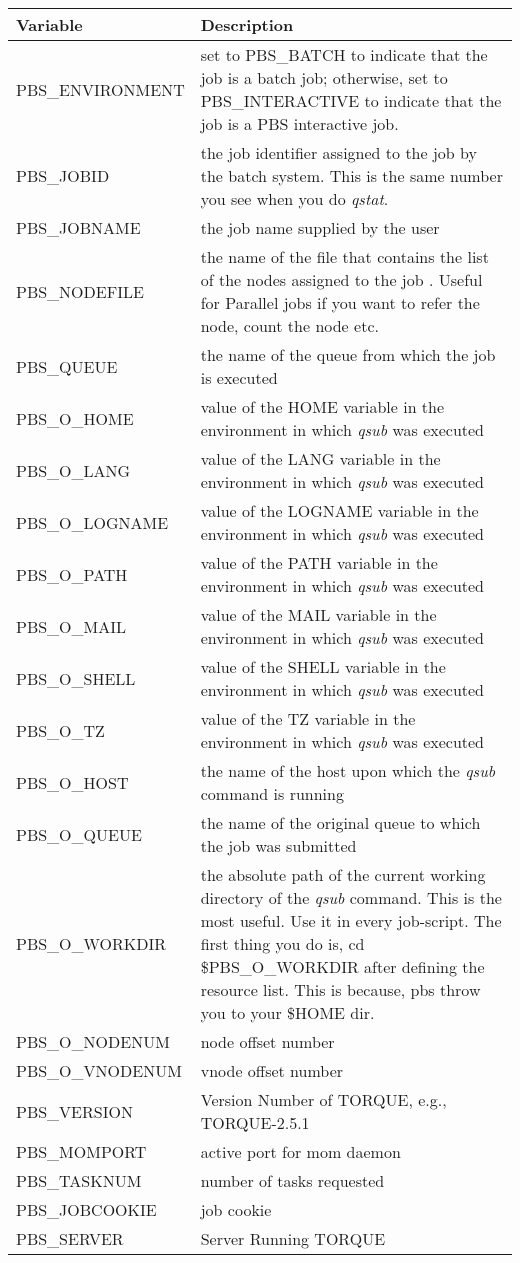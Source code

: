 \begin{tabular}{|p{1.2in}|p{3.0in}|} \hline
\textbf{Variable} & \textbf{Description} \\ \hline
PBS\_ENVIRONMENT & set to PBS\_BATCH to indicate that the job is a batch job; otherwise, set to PBS\_INTERACTIVE to indicate that the job is a PBS interactive job. \\ \hline
PBS\_JOBID & the job identifier assigned to the job by the batch system. This is the same number you see when you do \textit{qstat}. \\ \hline
PBS\_JOBNAME & the job name supplied by the user \\ \hline
PBS\_NODEFILE & the name of the file that contains the list of the nodes assigned to the job . Useful for Parallel jobs if you want to refer the node, count the node etc. \\ \hline
PBS\_QUEUE & the name of the queue from which the job is executed \\ \hline
PBS\_O\_HOME & value of the HOME variable in the environment in which \textit{qsub} was executed \\ \hline
PBS\_O\_LANG & value of the LANG variable in the environment in which \textit{qsub} was executed \\ \hline
PBS\_O\_LOGNAME & value of the LOGNAME variable in the environment in which \textit{qsub} was executed \\ \hline
PBS\_O\_PATH & value of the PATH variable in the environment in which \textit{qsub} was executed \\ \hline
PBS\_O\_MAIL & value of the MAIL variable in the environment in which \textit{qsub} was executed \\ \hline
PBS\_O\_SHELL & value of the SHELL variable in the environment in which \textit{qsub} was executed \\ \hline
PBS\_O\_TZ & value of the TZ variable in the environment in which \textit{qsub} was executed \\ \hline
PBS\_O\_HOST & the name of the host upon which the \textit{qsub} command is running \\ \hline
PBS\_O\_QUEUE & the name of the original queue to which the job was submitted \\ \hline
PBS\_O\_WORKDIR & the absolute path of the current working directory of the \textit{qsub} command. This is the most useful. Use it in every job-script. The first thing you do is, cd \$PBS\_O\_WORKDIR after defining the resource list. This is because, pbs throw you to your \$HOME dir. \\ \hline
PBS\_O\_NODENUM & node offset number \\ \hline
PBS\_O\_VNODENUM & vnode offset number \\ \hline
PBS\_VERSION & Version Number of TORQUE, e.g., TORQUE-2.5.1 \\ \hline
PBS\_MOMPORT & active port for mom daemon \\ \hline
PBS\_TASKNUM & number of tasks requested \\ \hline
PBS\_JOBCOOKIE & job cookie \\ \hline
PBS\_SERVER & Server Running TORQUE \\ \hline
\end{tabular}

